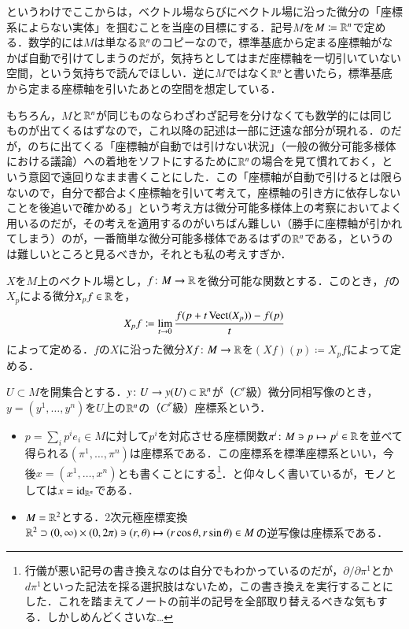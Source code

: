 というわけでここからは，ベクトル場ならびにベクトル場に沿った微分の「座標系によらない実体」を掴むことを当座の目標にする．記号$M$を$M \coloneqq \mathbb{R}^n$で定める．数学的には$M$は単なる$\mathbb{R}^n$のコピーなので，標準基底から定まる座標軸がなかば自動で引けてしまうのだが，気持ちとしてはまだ座標軸を一切引いていない空間，という気持ちで読んでほしい．逆に$M$ではなく$\mathbb{R}^n$と書いたら，標準基底から定まる座標軸を引いたあとの空間を想定している．

\begin{dig}
もちろん，$M$と$\mathbb{R}^n$が同じものならわざわざ記号を分けなくても数学的には同じものが出てくるはずなので，これ以降の記述は一部に迂遠な部分が現れる．のだが，のちに出てくる「座標軸が自動では引けない状況」（一般の微分可能多様体における議論）への着地をソフトにするために$\mathbb{R}^n$の場合を見て慣れておく，という意図で遠回りなまま書くことにした．この「座標軸が自動で引けるとは限らないので，自分で都合よく座標軸を引いて考えて，座標軸の引き方に依存しないことを後追いで確かめる」という考え方は微分可能多様体上の考察においてよく用いるのだが，その考えを適用するのがいちばん難しい（勝手に座標軸が引かれてしまう）のが，一番簡単な微分可能多様体であるはずの$\mathbb{R}^n$である，というのは難しいところと見るべきか，それとも私の考えすぎか．
\end{dig}

\begin{defi}
$X$を$M$上のベクトル場とし，$f \colon M \to \mathbb{R}$を微分可能な関数とする．このとき，$f$の$X_p$による微分$X_pf \in \mathbb{R}$を，
\begin{equation}
X_pf \coloneqq \lim_{t \to 0} \frac{f(p + t \operatorname{Vect}(X_p)) - f(p)}{t}
\end{equation}
によって定める．$f$の$X$に沿った微分$Xf \colon M \to \mathbb{R}$を$(Xf)(p) \coloneqq X_pf$によって定める．
\end{defi}

\begin{defi}
$U \subset M$を開集合とする．$y \colon U \to y(U) \subset \mathbb{R}^n$が（$C^r$級）微分同相写像のとき，$y = (y^1, \dots, y^n)$を$U$上の$\mathbb{R}^n$の（$C^r$級）座標系という．
\end{defi}

\begin{exm}[座標系の例]
\leavevmode
\begin{itemize}
\item $p = \sum_i p^i e_i \in M$に対して$p^i$を対応させる座標関数$\pi^i \colon M \ni p \mapsto p^i \in \mathbb{R}$を並べて得られる$(\pi^1, \dots, \pi^n)$は座標系である．この座標系を標準座標系といい，今後$x=(x^1, \dots, x^n)$とも書くことにする\footnote{行儀が悪い記号の書き換えなのは自分でもわかっているのだが，$\partial / \partial \pi ^1$とか$d\pi^1$といった記法を採る選択肢はないため，この書き換えを実行することにした．これを踏まえてノートの前半の記号を全部取り替えるべきな気もする．しかしめんどくさいな…}．と仰々しく書いているが，モノとしては$x = \operatorname{id}_{\mathbb{R}^n}$である．
\item $M = \mathbb{R}^2$とする．2次元極座標変換$\mathbb{R}^2 \supset (0, \infty) \times (0, 2\pi) \ni (r,\theta) \mapsto (r \cos \theta, r \sin \theta) \in M$の逆写像は座標系である．
\end{itemize}
\end{exm}

